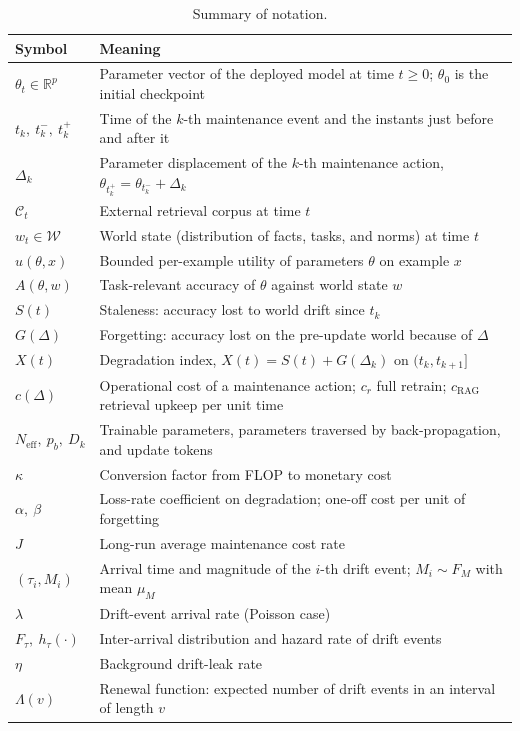 \documentclass[electronics,article,submit,pdftex,moreauthors]{Definitions/mdpi}
\newcommand{\D}{\varDelta}                 %
\newcommand{\Neff}{N_{\mathrm{eff}}}
\newcommand{\cRAG}{c_{\mathrm{RAG}}}
\newcommand{\tkm}{t_k^{-}}
\newcommand{\tkp}{t_k^{+}}
\newcommand{\calC}{\mathcal{C}}
\newcommand{\calW}{\mathcal{W}}
\begin{document}
\begin{table}[H]
\caption{Summary of notation.\label{tab:notation}}
\small
\begin{tabularx}{\textwidth}{lL}
\toprule
\textbf{Symbol} & \textbf{Meaning}\\
\midrule
$\theta_t\in\mathbb{R}^p$ & Parameter vector of the deployed model at time $t\ge 0$; $\theta_0$ is the initial checkpoint\\
$t_k,\ \tkm,\ \tkp$ & Time of the $k$-th maintenance event and the instants just before and after it\\
$\D_k$ & Parameter displacement of the $k$-th maintenance action, $\theta_{\tkp}=\theta_{\tkm}+\D_k$\\
$\calC_t$ & External retrieval corpus at time $t$\\
$w_t\in\calW$ & World state (distribution of facts, tasks, and norms) at time $t$\\
$u(\theta,x)$ & Bounded per-example utility of parameters $\theta$ on example $x$\\
$A(\theta,w)$ & Task-relevant accuracy of $\theta$ against world state $w$\\
$S(t)$ & Staleness: accuracy lost to world drift since $t_k$\\
$G(\D)$ & Forgetting: accuracy lost on the pre-update world because of $\D$\\
$X(t)$ & Degradation index, $X(t)=S(t)+G(\D_k)$ on $(t_k,t_{k+1}]$\\
$c(\D)$ & Operational cost of a maintenance action; $c_r$ full retrain; $\cRAG$ retrieval upkeep per unit time\\
$\Neff,\ p_b,\ D_k$ & Trainable parameters, parameters traversed by back-propagation, and update tokens\\
$\kappa$ & Conversion factor from FLOP to monetary cost\\
$\alpha,\ \beta$ & Loss-rate coefficient on degradation; one-off cost per unit of forgetting\\
$J$ & Long-run average maintenance cost rate\\
$(\tau_i,M_i)$ & Arrival time and magnitude of the $i$-th drift event; $M_i\sim F_M$ with mean $\mu_M$\\
$\lambda$ & Drift-event arrival rate (Poisson case)\\
$F_\tau,\ h_\tau(\cdot)$ & Inter-arrival distribution and hazard rate of drift events\\
$\eta$ & Background drift-leak rate\\
$\Lambda(v)$ & Renewal function: expected number of drift events in an interval of length $v$\\

\end{tabularx}
\end{table}
\end{document}

